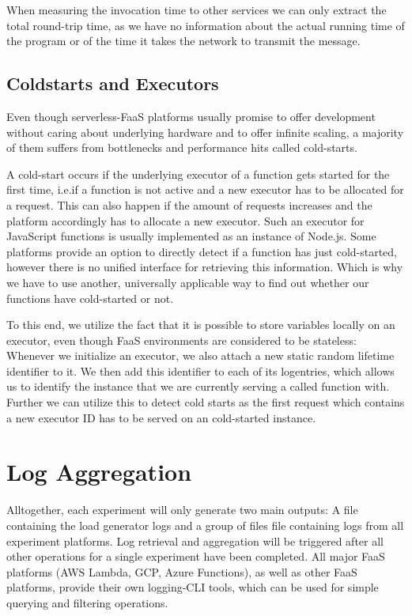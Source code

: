 \documentclass[../main.tex]{subfiles}
\begin{document}
When measuring the invocation time to other services we can only extract the total round-trip time,
as we have no information about the actual running time of the program or of the time it takes the network to transmit the message.

\subsection{Coldstarts and Executors}%
\label{sub:coldStartProbing}

Even though serverless-FaaS platforms usually promise to offer development without caring about underlying hardware and to offer infinite scaling, 
a majority of them suffers from bottlenecks and performance hits called cold-starts. 

A cold-start occurs if the underlying executor of a function gets started for the first time, 
i.e.\@ if a function is not active and a new executor has to be allocated for a request. 
This can also happen if the amount of requests increases and the platform accordingly has to allocate a new executor. 
Such an executor for JavaScript functions is usually implemented as an instance of Node.js.
Some platforms provide an option to directly detect if a function has just cold-started, 
however there is no unified interface for retrieving this information. 
Which is why we have to use another, universally applicable way to find out whether our functions have cold-started or not.

To this end, we utilize the fact that it is possible to store variables locally on an executor, 
even though FaaS environments are considered to be stateless: 
Whenever we initialize an executor, we also attach a new static random lifetime identifier to it. 
We then add this identifier to each of its logentries, 
which allows us to identify the instance that we are currently serving a called function with. 
Further we can utilize this to detect cold starts as the first request which contains a new executor ID 
has to be served on an cold-started instance.


\section{Log Aggregation}%
\label{sec:designLogAggregation}

Alltogether, each experiment will only generate two main outputs: 
A file containing the load generator logs and a group of files file containing logs from all experiment platforms.
Log retrieval and aggregation will be triggered after all other operations for a single experiment have been completed. 
All major FaaS platforms (AWS Lambda, GCP, Azure Functions), as well as other FaaS platforms, provide their own logging-CLI tools,
which can be used for simple querying and filtering operations. 
\end{document}
